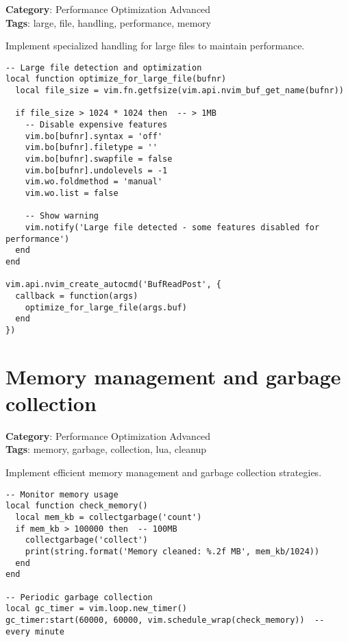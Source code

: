 {{{{{{{{{{\textbf{Category}: Performance Optimization Advanced\\ \textbf{Tags}: large, file, handling, performance, memory
\vspace{0.5cm}

Implement specialized handling for large files to maintain performance.

\begin{Exa*}{}
\begin{Verbatim}[fontsize=\footnotesize, breaklines, breakanywhere]
-- Large file detection and optimization
local function optimize_for_large_file(bufnr)
  local file_size = vim.fn.getfsize(vim.api.nvim_buf_get_name(bufnr))
  
  if file_size > 1024 * 1024 then  -- > 1MB
    -- Disable expensive features
    vim.bo[bufnr].syntax = 'off'
    vim.bo[bufnr].filetype = ''
    vim.bo[bufnr].swapfile = false
    vim.bo[bufnr].undolevels = -1
    vim.wo.foldmethod = 'manual'
    vim.wo.list = false
    
    -- Show warning
    vim.notify('Large file detected - some features disabled for performance')
  end
end

vim.api.nvim_create_autocmd('BufReadPost', {
  callback = function(args)
    optimize_for_large_file(args.buf)
  end
})
\end{Verbatim}
\end{Exa*}

\section{Memory management and garbage collection}

\textbf{Category}: Performance Optimization Advanced\\ \textbf{Tags}: memory, garbage, collection, lua, cleanup
\vspace{0.5cm}

Implement efficient memory management and garbage collection strategies.

\begin{Exa*}{}
\begin{Verbatim}[fontsize=\footnotesize, breaklines, breakanywhere]
-- Monitor memory usage
local function check_memory()
  local mem_kb = collectgarbage('count')
  if mem_kb > 100000 then  -- 100MB
    collectgarbage('collect')
    print(string.format('Memory cleaned: %.2f MB', mem_kb/1024))
  end
end

-- Periodic garbage collection
local gc_timer = vim.loop.new_timer()
gc_timer:start(60000, 60000, vim.schedule_wrap(check_memory))  -- every minute


\end{Verbatim}
\end{Exa*}}}}}}}}}}}
